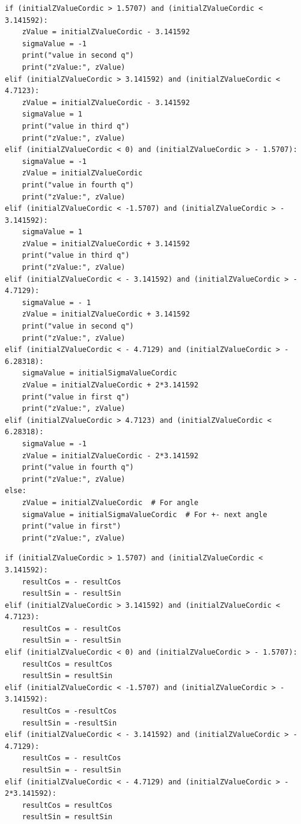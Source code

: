 \documentclass[a4paper, twoside, 11pt]{article}
\begin{document}
\begin{lstlisting}[language={pseudocode}, caption={Pseudocode for if statements used at the value initialization of the \gls{abbreviation:cordic} algorithm.}, label= {lst:cordic-initial-if-statements}]
if (initialZValueCordic > 1.5707) and (initialZValueCordic < 3.141592):
    zValue = initialZValueCordic - 3.141592
    sigmaValue = -1
    print("value in second q")
    print("zValue:", zValue)
elif (initialZValueCordic > 3.141592) and (initialZValueCordic < 4.7123):
    zValue = initialZValueCordic - 3.141592
    sigmaValue = 1
    print("value in third q")
    print("zValue:", zValue)
elif (initialZValueCordic < 0) and (initialZValueCordic > - 1.5707):
    sigmaValue = -1
    zValue = initialZValueCordic
    print("value in fourth q")
    print("zValue:", zValue)
elif (initialZValueCordic < -1.5707) and (initialZValueCordic > - 3.141592):
    sigmaValue = 1
    zValue = initialZValueCordic + 3.141592
    print("value in third q")
    print("zValue:", zValue)
elif (initialZValueCordic < - 3.141592) and (initialZValueCordic > - 4.7129):
    sigmaValue = - 1
    zValue = initialZValueCordic + 3.141592
    print("value in second q")
    print("zValue:", zValue)
elif (initialZValueCordic < - 4.7129) and (initialZValueCordic > - 6.28318):
    sigmaValue = initialSigmaValueCordic
    zValue = initialZValueCordic + 2*3.141592
    print("value in first q")
    print("zValue:", zValue)
elif (initialZValueCordic > 4.7123) and (initialZValueCordic < 6.28318):
    sigmaValue = -1
    zValue = initialZValueCordic - 2*3.141592
    print("value in fourth q")
    print("zValue:", zValue)
else:
    zValue = initialZValueCordic  # For angle
    sigmaValue = initialSigmaValueCordic  # For +- next angle
    print("value in first")
    print("zValue:", zValue)
\end{lstlisting}


\begin{lstlisting}[language={pseudocode}, caption={Pseudocode for if statements used at the final $sinus$ and $cosinus$ value calculation.}, label= {lst:cordic-ending-if-statements}]
if (initialZValueCordic > 1.5707) and (initialZValueCordic < 3.141592):
    resultCos = - resultCos
    resultSin = - resultSin
elif (initialZValueCordic > 3.141592) and (initialZValueCordic < 4.7123):
    resultCos = - resultCos
    resultSin = - resultSin
elif (initialZValueCordic < 0) and (initialZValueCordic > - 1.5707):
    resultCos = resultCos
    resultSin = resultSin
elif (initialZValueCordic < -1.5707) and (initialZValueCordic > - 3.141592):
    resultCos = -resultCos
    resultSin = -resultSin
elif (initialZValueCordic < - 3.141592) and (initialZValueCordic > - 4.7129):
    resultCos = - resultCos
    resultSin = - resultSin
elif (initialZValueCordic < - 4.7129) and (initialZValueCordic > - 2*3.141592):
    resultCos = resultCos
    resultSin = resultSin
\end{lstlisting}
\end{document}
